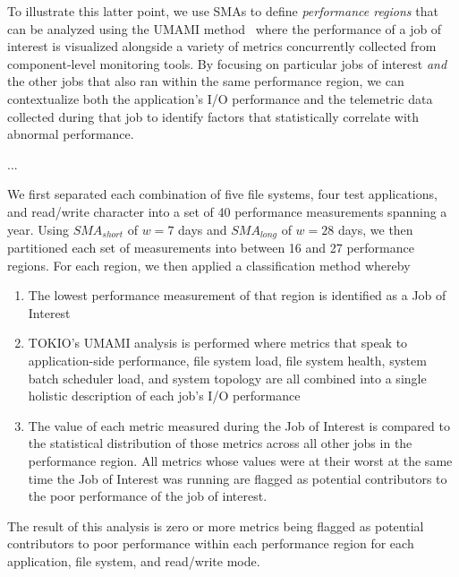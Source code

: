 
To illustrate this latter point, we use SMAs to define \emph{performance regions} that can be analyzed using the UMAMI method~\cite{Lockwood2017} where the performance of a job of interest is visualized alongside a variety of metrics concurrently collected from component-level monitoring tools.
By focusing on particular jobs of interest \emph{and} the other jobs that also ran within the same performance region, we can contextualize both the application's I/O performance and the telemetric data collected during that job to identify factors that statistically correlate with abnormal performance.

...

We first separated each combination of five file systems, four test applications, and read/write character into a set of 40 performance measurements spanning a year.
Using $SMA_{short}$ of $w = 7$ days and $SMA_{long}$ of $w = 28$ days, we then partitioned each set of measurements into between 16 and 27 performance regions.
For each region, we then applied a classification method whereby
\begin{enumerate}
\item The lowest performance measurement of that region is identified as a Job of Interest
\item TOKIO's UMAMI analysis is performed where metrics that speak to application-side performance, file system load, file system health, system batch scheduler load, and system topology are all combined into a single holistic description of each job's I/O performance
\item The value of each metric measured during the Job of Interest is compared to the statistical distribution of those metrics across all other jobs in the performance region.  All metrics whose values were at their worst at the same time the Job of Interest was running are flagged as potential contributors to the poor performance of the job of interest.
\end{enumerate}

The result of this analysis is zero or more metrics being flagged as potential contributors to poor performance within each performance region for each application, file system, and read/write mode.

